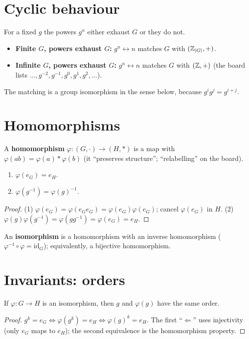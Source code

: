 \documentclass[11pt]{article}
\begin{document}
\section*{Cyclic behaviour}

For a fixed $g$ the powers $g^n$ either exhaust $G$ or they do not.
\begin{itemize}[nosep]
  \item \textbf{Finite $G$, powers exhaust $G$:} $g^n\leftrightarrow n$ matches $G$ with $(\mathbb{Z}_{|G|},+)$.
  \item \textbf{Infinite $G$, powers exhaust $G$:} $g^n\leftrightarrow n$ matches $G$ with $(\mathbb{Z},+)$ (the board lists $\dots,g^{-2},g^{-1},g^0,g^1,g^2,\dots$).
\end{itemize}
The matching is a group isomorphism in the sense below, because $g^ig^j=g^{i+j}$.

\section*{Homomorphisms}

A \textbf{homomorphism} $\varphi:(G,\cdot)\to(H,*)$ is a map with $\varphi(ab)=\varphi(a)*\varphi(b)$ (it ``preserves structure''; ``relabelling'' on the board).

\begin{claim}[Consequences]
\begin{enumerate}[nosep]
  \item $\varphi(e_G)=e_H$.
  \item $\varphi(g^{-1})=\varphi(g)^{-1}$.
\end{enumerate}
\end{claim}
\begin{proof}
(1) $\varphi(e_G)=\varphi(e_Ge_G)=\varphi(e_G)\varphi(e_G)$; cancel $\varphi(e_G)$ in $H$.
(2) $\varphi(g)\varphi(g^{-1})=\varphi(gg^{-1})=\varphi(e_G)=e_H$.
\end{proof}

An \textbf{isomorphism} is a homomorphism with an inverse homomorphism ($\varphi^{-1}\circ\varphi=\mathrm{id}_G$); equivalently, a bijective homomorphism.

\section*{Invariants: orders}

\begin{claim}
If $\varphi:G\to H$ is an isomorphism, then $g$ and $\varphi(g)$ have the same order.
\end{claim}
\begin{proof}
$g^k=e_G\iff\varphi(g^k)=e_H\iff\varphi(g)^k=e_H$. The first ``$\Leftarrow$'' uses injectivity (only $e_G$ maps to $e_H$); the second equivalence is the homomorphism property.
\end{proof}
\end{document}
